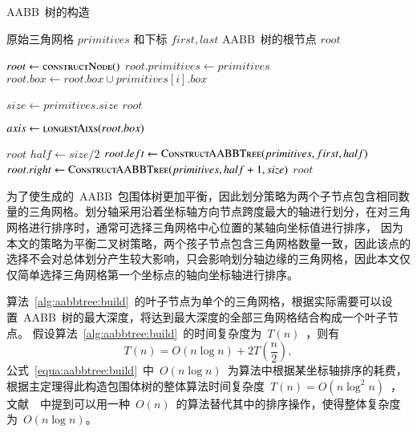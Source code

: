 \begin{algorithm}[htb]
\small
\caption{AABB~树的构造}
\label{alg:aabbtree:build}
\begin{algorithmic}[1]
\Require
原始三角网格 $primitives$ 和下标 $first, last$
\Ensure
AABB~树的根节点 $root$

  \State $root \gets \Call{constructNode()}{}$ 
  \State $root.primitives \gets primitives$
      \State $root.box \gets root.box \cup primitives[i].box$
  \EndFor

  \State $size \gets primitives.size$  
  \State \Return $root$
  \EndIf

  \State $axis \gets \Call{longestAixs}{root.box}$
  
      \State \Return $root$
  \EndIf
  \State $half \gets size / 2 $
  \State $root.left \gets \Call{ConstructAABBTree}{primitives, first, half}$
  \State {}
  \State $root.right \gets \Call{ConstructAABBTree}{primitives, half+1, size}$ 
  \State \Return $root$
\EndFunction
\end{algorithmic}
\end{algorithm}

为了使生成的~AABB~包围体树更加平衡，因此划分策略为两个子节点包含相同数量的三角网格。划分轴采用沿着坐标轴方向节点跨度最大的轴进行划分，在对三角网格进行排序时，通常可选择三角网格中心位置的某轴向坐标值进行排序，
因为本文的策略为平衡二叉树策略，两个孩子节点包含三角网格数量一致，因此该点的选择不会对总体划分产生较大影响，只会影响划分轴边缘的三角网格，因此本文仅仅简单选择三角网格第一个坐标点的轴向坐标轴进行排序。

算法~\ref{alg:aabbtree:build}~的叶子节点为单个的三角网格，根据实际需要可以设置~AABB~树的最大深度，将达到最大深度的全部三角网格结合构成一个叶子节点。
假设算法~\ref{alg:aabbtree:build}~的时间复杂度为~$T(n)$~，则有
\begin{equation}
  T(n) = O(n \log n ) + 2T(\frac{n}{2}),
\label{equa:aabbtree:build}
\end{equation}
公式~\ref{equa:aabbtree:build}~中~$O(n \log n)$~为算法中根据某坐标轴排序的耗费，根据主定理得此构造包围体树的整体算法时间复杂度~$T(n)=O(n\log^2n)$~，文献~~中提到可以用一种~$O(n)$~的算法替代其中的排序操作，使得整体复杂度为~$O(n\log n)$。


